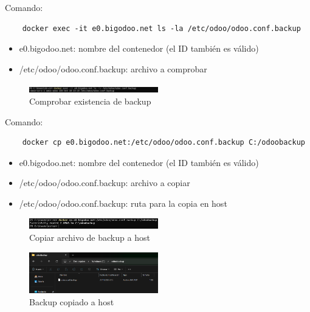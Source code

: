 \documentclass[a4paper,12pt]{article}
\begin{document}
Comando: 
\begin{verbatim}
    docker exec -it e0.bigodoo.net ls -la /etc/odoo/odoo.conf.backup
\end{verbatim}

\begin{itemize}
    \item e0.bigodoo.net: nombre del contenedor (el ID también es válido)
    \item /etc/odoo/odoo.conf.backup: archivo a comprobar
\end{itemize}

\begin{figure}[h!]
    \centering
    \includegraphics[width=0.5\textwidth]{pr2odoo84-comprobarBackup.png}
    \caption{Comprobar existencia de backup}
\end{figure}
\FloatBarrier

Comando: 
\begin{verbatim}
    docker cp e0.bigodoo.net:/etc/odoo/odoo.conf.backup C:/odoobackup
\end{verbatim}

\begin{itemize}
    \item e0.bigodoo.net: nombre del contenedor (el ID también es válido)
    \item /etc/odoo/odoo.conf.backup: archivo a copiar
    \item /etc/odoo/odoo.conf.backup: ruta para la copia en host
\end{itemize}

\begin{figure}[h!]
    \centering
    \includegraphics[width=0.5\textwidth]{pr2odoo85-copiarBackupAhost.png}
    \caption{Copiar archivo de backup a host}
\end{figure}
\FloatBarrier

\begin{figure}[h!]
    \centering
    \includegraphics[width=0.5\textwidth]{pr2odoo86-backupCopiado.png}
    \caption{Backup copiado a host}
\end{figure}
\FloatBarrier
\end{document}
